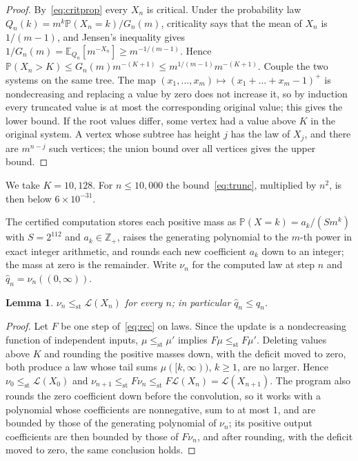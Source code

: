 \documentclass[11pt]{amsart}
\newtheorem{lemma}[theorem]{Lemma}
\theoremstyle{remark}
\numberwithin{equation}{section}
\newcommand{\PP}{\mathbb{P}}
\newcommand{\EE}{\mathbb{E}}
\begin{document}
\begin{proof}
By~\eqref{eq:critprop} every $X_n$ is critical. Under the probability law $Q_n(k)=m^k\PP(X_n=k)/G_n(m)$, criticality says that the mean of $X_n$ is $1/(m-1)$, and Jensen's inequality gives $1/G_n(m)=\EE_{Q_n}[m^{-X_n}]\ge m^{-1/(m-1)}$. Hence $\PP(X_n>K)\le G_n(m)m^{-(K+1)}\le m^{1/(m-1)}m^{-(K+1)}$. Couple the two systems on the same tree. The map $(x_1,\dots,x_m)\mapsto(x_1+\dots+x_m-1)^+$ is nondecreasing and replacing a value by zero does not increase it, so by induction every truncated value is at most the corresponding original value; this gives the lower bound. If the root values differ, some vertex had a value above $K$ in the original system. A vertex whose subtree has height $j$ has the law of $X_j$, and there are $m^{n-j}$ such vertices; the union bound over all vertices gives the upper bound.
\end{proof}

We take $K=10{,}128$. For $n\le10{,}000$ the bound~\eqref{eq:trunc}, multiplied by $n^2$, is then below $6\times10^{-31}$.

The certified computation stores each positive mass as $\PP(X=k)=a_k/(Sm^k)$ with $S=2^{112}$ and $a_k\in\mathbb Z_+$, raises the generating polynomial to the $m$-th power in exact integer arithmetic, and rounds each new coefficient $a_k$ down to an integer; the mass at zero is the remainder. Write $\nu_n$ for the computed law at step $n$ and $\widehat q_n=\nu_n((0,\infty))$.

\begin{lemma}\label{lem:order}
$\nu_n\le_{\mathrm{st}}\mathcal L(X_n)$ for every $n$; in particular $\widehat q_n\le q_n$.
\end{lemma}

\begin{proof}
Let $F$ be one step of~\eqref{eq:rec} on laws. Since the update is a nondecreasing function of independent inputs, $\mu\le_{\mathrm{st}}\mu'$ implies $F\mu\le_{\mathrm{st}}F\mu'$. Deleting values above $K$ and rounding the positive masses down, with the deficit moved to zero, both produce a law whose tail sums $\mu([k,\infty))$, $k\ge1$, are no larger. Hence $\nu_0\le_{\mathrm{st}}\mathcal L(X_0)$ and $\nu_{n+1}\le_{\mathrm{st}}F\nu_n\le_{\mathrm{st}}F\mathcal L(X_n)=\mathcal L(X_{n+1})$. The program also rounds the zero coefficient down before the convolution, so it works with a polynomial whose coefficients are nonnegative, sum to at most $1$, and are bounded by those of the generating polynomial of $\nu_n$; its positive output coefficients are then bounded by those of $F\nu_n$, and after rounding, with the deficit moved to zero, the same conclusion holds.
\end{proof}
\end{document}

